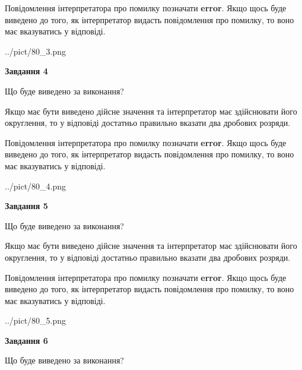 \documentclass[12pt, ukrainian]{article}
\begin{document}
{\begin {Large}
Повідомлення інтерпретатора про помилку позначати \textbf{error}.
Якщо щось буде виведено до того, як інтерпретатор видасть повідомлення про помилку, 
то воно має вказуватись у відповіді. \par

\begin{center}
	{../pict/80_3.png}
\end{center}
\newpage

{\begin {center}\textbf{Завдання 4}\end {center}}\par
Що буде виведено за виконання? \par

Якщо має бути виведено дійсне значення та інтерпретатор має здійснювати його округлення, 
то у відповіді достатньо правильно вказати два дробових розряди.

Повідомлення інтерпретатора про помилку позначати \textbf{error}.
Якщо щось буде виведено до того, як інтерпретатор видасть повідомлення про помилку, 
то воно має вказуватись у відповіді. \par

\begin{center}
	{../pict/80_4.png}
\end{center}
\newpage

{\begin {center}\textbf{Завдання 5}\end {center}}\par
Що буде виведено за виконання? \par

Якщо має бути виведено дійсне значення та інтерпретатор має здійснювати його округлення, 
то у відповіді достатньо правильно вказати два дробових розряди.

Повідомлення інтерпретатора про помилку позначати \textbf{error}.
Якщо щось буде виведено до того, як інтерпретатор видасть повідомлення про помилку, 
то воно має вказуватись у відповіді. \par

\begin{center}
	{../pict/80_5.png}
\end{center}
\newpage

{\begin {center}\textbf{Завдання 6}\end {center}}\par
Що буде виведено за виконання? \par


\end{Large}}
\end{document}
